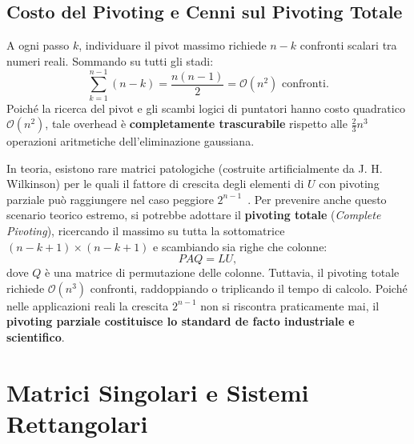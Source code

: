 \subsection{Costo del Pivoting e Cenni sul Pivoting Totale}
\begin{property}
A ogni passo $k$, individuare il pivot massimo richiede $n - k$ confronti scalari tra numeri reali. Sommando su tutti gli stadi:
\begin{equation}
    \sum_{k=1}^{n-1} (n - k) = \frac{n(n-1)}{2} = \mathcal{O}(n^2) \text{ confronti.}
\end{equation}
Poich\'e la ricerca del pivot e gli scambi logici di puntatori hanno costo quadratico $\mathcal{O}(n^2)$, tale overhead \`e \textbf{completamente trascurabile} rispetto alle $\frac{2}{3}n^3$ operazioni aritmetiche dell'eliminazione gaussiana.
\end{property}

\begin{remark}
In teoria, esistono rare matrici patologiche (costruite artificialmente da J. H. Wilkinson) per le quali il fattore di crescita degli elementi di $U$ con pivoting parziale pu\`o raggiungere nel caso peggiore $2^{n-1}$~\cite{trefethen1997numerical}. Per prevenire anche questo scenario teorico estremo, si potrebbe adottare il \textbf{pivoting totale} (\textit{Complete Pivoting}), ricercando il massimo su tutta la sottomatrice $(n-k+1) \times (n-k+1)$ e scambiando sia righe che colonne:
\begin{equation}
    P A Q = L U,
\end{equation}
dove $Q$ \`e una matrice di permutazione delle colonne. Tuttavia, il pivoting totale richiede $\mathcal{O}(n^3)$ confronti, raddoppiando o triplicando il tempo di calcolo. Poich\'e nelle applicazioni reali la crescita $2^{n-1}$ non si riscontra praticamente mai, il \textbf{pivoting parziale costituisce lo standard de facto industriale e scientifico}.
\end{remark}

\FloatBarrier
\section{Matrici Singolari e Sistemi Rettangolari}
\label{sec:matrici-singolari-rettangolari}

